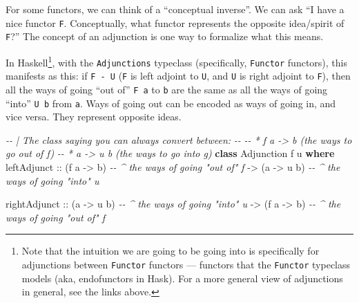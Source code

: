 \documentclass[]{article}
\newenvironment{Shaded}{}{}
\newcommand{\CommentTok}[1]{\textcolor[rgb]{0.38,0.63,0.69}{\textit{#1}}}
\newcommand{\DataTypeTok}[1]{\textcolor[rgb]{0.56,0.13,0.00}{#1}}
\newcommand{\KeywordTok}[1]{\textcolor[rgb]{0.00,0.44,0.13}{\textbf{#1}}}
\newcommand{\NormalTok}[1]{#1}
\newcommand{\OtherTok}[1]{\textcolor[rgb]{0.00,0.44,0.13}{#1}}
\begin{document}
For some functors, we can think of a ``conceptual inverse''. We can ask ``I have
a nice functor \texttt{F}. Conceptually, what functor represents the opposite
idea/spirit of \texttt{F}?'' The concept of an adjunction is one way to
formalize what this means.

In Haskell\footnote{Note that the intuition we are going to be going into is
  specifically for adjunctions between \texttt{Functor} functors --- functors
  that the \texttt{Functor} typeclass models (aka, endofunctors in Hask). For a
  more general view of adjunctions in general, see the links above.}, with the
\texttt{Adjunctions} typeclass (specifically, \texttt{Functor} functors), this
manifests as this: if \texttt{F\ -\textbar{}\ U} (\texttt{F} is left adjoint to
\texttt{U}, and \texttt{U} is right adjoint to \texttt{F}), then all the ways of
going ``out of'' \texttt{F\ a} to \texttt{b} are the same as all the ways of
going ``into'' \texttt{U\ b} from \texttt{a}. Ways of going out can be encoded
as ways of going in, and vice versa. They represent opposite ideas.

\begin{Shaded}
\begin{Highlighting}[]
\CommentTok{{-}{-} | The class saying you can always convert between:}
\CommentTok{{-}{-}}
\CommentTok{{-}{-} * \textasciigrave{}f a {-}\textgreater{} b\textasciigrave{} (the ways to go out of \textasciigrave{}f\textasciigrave{})}
\CommentTok{{-}{-} * \textasciigrave{}a {-}\textgreater{} u b\textasciigrave{} (the ways to go into \textasciigrave{}g\textasciigrave{})}
\KeywordTok{class} \DataTypeTok{Adjunction}\NormalTok{ f u }\KeywordTok{where}
\NormalTok{    leftAdjunct}
\OtherTok{        ::}\NormalTok{ (f a }\OtherTok{{-}\textgreater{}}\NormalTok{ b)       }\CommentTok{{-}{-} \^{} the ways of going "out of" \textasciigrave{}f\textasciigrave{}}
        \OtherTok{{-}\textgreater{}}\NormalTok{ (a }\OtherTok{{-}\textgreater{}}\NormalTok{ u b)       }\CommentTok{{-}{-} \^{} the ways of going "into" \textasciigrave{}u\textasciigrave{}}

\NormalTok{    rightAdjunct}
\OtherTok{        ::}\NormalTok{ (a }\OtherTok{{-}\textgreater{}}\NormalTok{ u b)       }\CommentTok{{-}{-} \^{} the ways of going "into" u}
        \OtherTok{{-}\textgreater{}}\NormalTok{ (f a }\OtherTok{{-}\textgreater{}}\NormalTok{ b)       }\CommentTok{{-}{-} \^{} the ways of going "out of" f}
\end{Highlighting}
\end{Shaded}
\end{document}

